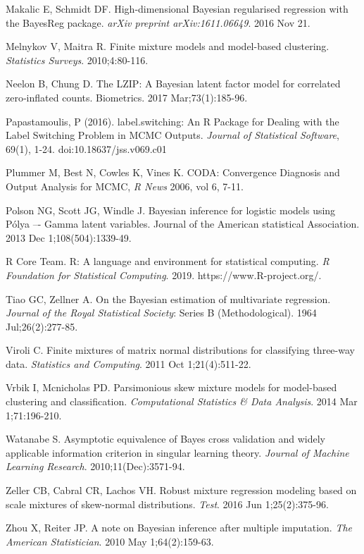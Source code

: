 \documentclass[useAMS,referee]{biom}
\begin{document}
\begin{thebibliography}{}
\bibitem{ } Makalic E, Schmidt DF. High-dimensional Bayesian regularised regression with the BayesReg package. \textit{arXiv preprint arXiv:1611.06649}. 2016 Nov 21.

\bibitem{ } Melnykov V, Maitra R. Finite mixture models and model-based clustering. \textit{Statistics Surveys}. 2010;4:80-116.

\bibitem{ } Neelon B, Chung D. The LZIP: A Bayesian latent factor model for correlated zero‐inflated counts. Biometrics. 2017 Mar;73(1):185-96.

\bibitem{ } Papastamoulis, P (2016). label.switching: An R Package for Dealing with the Label Switching Problem in MCMC Outputs. \textit{Journal of Statistical Software}, 69(1), 1-24. doi:10.18637/jss.v069.c01

\bibitem{} Plummer M, Best N, Cowles K, Vines K. CODA: Convergence Diagnosis and Output Analysis for MCMC, \textit{R News} 2006, vol 6, 7-11.

\bibitem{ } Polson NG, Scott JG, Windle J. Bayesian inference for logistic models using P\'olya –- Gamma latent variables. Journal of the American statistical Association. 2013 Dec 1;108(504):1339-49.

\bibitem{ } R Core Team. R: A language and environment for statistical computing. \textit{R Foundation for Statistical Computing}. 2019. https://www.R-project.org/.

\bibitem{ } Tiao GC, Zellner A. On the Bayesian estimation of multivariate regression. \textit{Journal of the Royal Statistical Society}: Series B (Methodological). 1964 Jul;26(2):277-85.

\bibitem{ } Viroli C. Finite mixtures of matrix normal distributions for classifying three-way data. \textit{Statistics and Computing}. 2011 Oct 1;21(4):511-22.

\bibitem{ } Vrbik I, Mcnicholas PD. Parsimonious skew mixture models for model-based clustering and classification. \textit{Computational Statistics \& Data Analysis}. 2014 Mar 1;71:196-210.

\bibitem{ } Watanabe S. Asymptotic equivalence of Bayes cross validation and widely applicable information criterion in singular learning theory. \textit{Journal of Machine Learning Research}. 2010;11(Dec):3571-94.

\bibitem{ } Zeller CB, Cabral CR, Lachos VH. Robust mixture regression modeling based on scale mixtures of skew-normal distributions. \textit{Test}. 2016 Jun 1;25(2):375-96.

\bibitem{ } Zhou X, Reiter JP. A note on Bayesian inference after multiple imputation. \textit{The American Statistician}. 2010 May 1;64(2):159-63.

\end{thebibliography}
\end{document}
